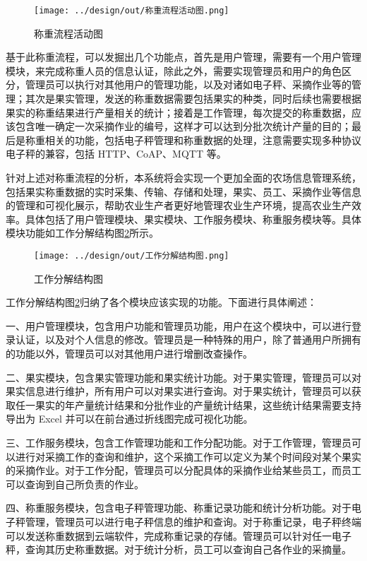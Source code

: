 \begin{figure}[H]
    \centering
    \texttt{[image: ../design/out/称重流程活动图.png]}
    \caption{称重流程活动图}
    \label{fig:称重流程活动图}
\end{figure}

基于此称重流程，可以发掘出几个功能点，首先是用户管理，需要有一个用户管理模块，来完成称重人员的信息认证，除此之外，需要实现管理员和用户的角色区分，管理员可以执行对其他用户的管理功能，以及对诸如电子秤、采摘作业等的管理；其次是果实管理，发送的称重数据需要包括果实的种类，同时后续也需要根据果实的称重结果进行产量相关的统计；接着是工作管理，每次提交的称重数据，应该包含唯一确定一次采摘作业的编号，这样才可以达到分批次统计产量的目的；最后是称重相关的功能，包括电子秤管理和称重数据的处理，注意需要实现多种协议电子秤的兼容，包括 HTTP、CoAP、MQTT 等。

针对上述对称重流程的分析，本系统将会实现一个更加全面的农场信息管理系统，包括果实称重数据的实时采集、传输、存储和处理，果实、员工、采摘作业等信息的管理和可视化展示，帮助农业生产者更好地管理农业生产环境，提高农业生产效率。具体包括了用户管理模块、果实模块、工作服务模块、称重服务模块等。具体模块功能如工作分解结构图\ref{fig:工作分解结构图}所示。

\begin{figure}[H]
    \centering
    \texttt{[image: ../design/out/工作分解结构图.png]}
    \caption{工作分解结构图}
    \label{fig:工作分解结构图}
\end{figure}

工作分解结构图\ref{fig:工作分解结构图}归纳了各个模块应该实现的功能。下面进行具体阐述：

一、用户管理模块，包含用户功能和管理员功能，用户在这个模块中，可以进行登录认证，以及对个人信息的修改。管理员是一种特殊的用户，除了普通用户所拥有的功能以外，管理员可以对其他用户进行增删改查操作。

二、果实模块，包含果实管理功能和果实统计功能。对于果实管理，管理员可以对果实信息进行维护，所有用户可以对果实进行查询。对于果实统计，管理员可以获取任一果实的年产量统计结果和分批作业的产量统计结果，这些统计结果需要支持导出为 Excel 并可以在前台通过折线图完成可视化功能。

三、工作服务模块，包含工作管理功能和工作分配功能。对于工作管理，管理员可以进行对采摘工作的查询和维护，这个采摘工作可以定义为某个时间段对某个果实的采摘作业。对于工作分配，管理员可以分配具体的采摘作业给某些员工，而员工可以查询到自己所负责的作业。

四、称重服务模块，包含电子秤管理功能、称重记录功能和统计分析功能。对于电子秤管理，管理员可以进行电子秤信息的维护和查询。对于称重记录，电子秤终端可以发送称重数据到云端软件，完成称重记录的存储。管理员可以针对任一电子秤，查询其历史称重数据。对于统计分析，员工可以查询自己各作业的采摘量。


